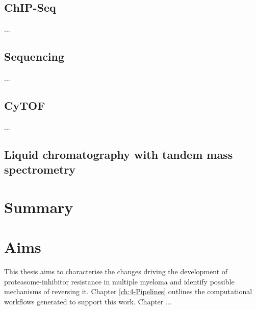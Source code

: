 \subsection{ChIP-Seq}
...

\subsection{Sequencing}
...

\subsection{CyTOF}
...


\subsection{Liquid chromatography with tandem mass spectrometry}

\section{Summary}

\section{Aims}
This thesis aims to characterise the changes driving the development of proteasome-inhibitor resistance in multiple myeloma and identify possible mechanisms of reversing it.
Chapter \ref{ch:4-Pipelines} outlines the computational workflows generated to support this work.
Chapter ...